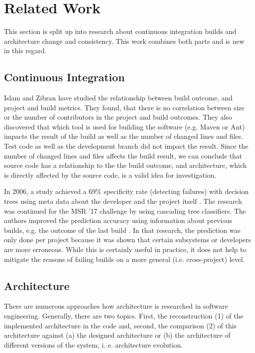 \documentclass[conference]{IEEEtran}
\begin{document}
\section{Related Work}
\label{sec:RelWork}

This section is split up into research about continuous integration builds and architecture change and consistency. This work combines both parts and is new in this regard. 

\subsection{Continuous Integration}

Islam and Zibran \cite{FailsCorr} have studied the relationship between build outcome, and project and build metrics. They found, that there is no correlation between size or the number of contributors in the project and build outcomes. 
They also discovered that which tool is used for building the software (e.g. Maven or Ant) impacts the result of the build as well as the number of changed lines and files. Test code as well as the development branch did not impact the result. 
Since the number of changed lines and files affects the build result, we can conclude that source code has a relationship to the the build outcome, and architecture, which is directly affected by the source code, is a valid idea for investigation.

In 2006, a study achieved a 69\% specificity rate (detecting failures) with decision trees using meta data about the developer and the project itself \cite{Pred-Tree}.
The research was continued for the MSR '17 challenge by using cascading tree classifiers. The authors improved the prediction accuracy using information about previous builds, e.g. the outcome of the last build \cite{Pred-Cascade}. 
In that research, the prediction was only done per project because it was shown that certain subsystems or developers are more erroneous. While this is certainly useful in practice, it does not help to mitigate the reasons of failing builds on a more general (i.e. cross-project) level.

\subsection{Architecture}

There are numerous approaches how architecture is researched in software engineering. Generally, there are two topics. First, the reconstruction (1) of the implemented architecture in the code and, second, the comparison (2) of this architecture against (a) the designed architecture or (b) the architecture of different versions of the system, i. e. architecture evolution. 
\end{document}

